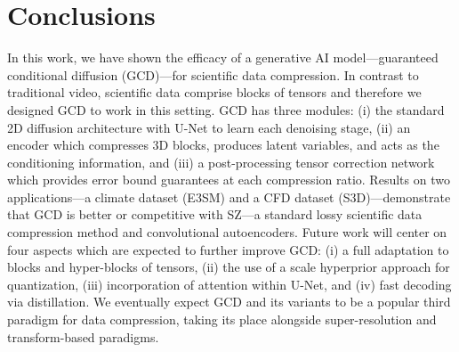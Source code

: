 \section{Conclusions}

In this work, we have shown the efficacy of a generative AI model---guaranteed conditional diffusion (GCD)---for scientific data compression. In contrast to traditional video, scientific data comprise blocks of tensors and therefore we designed GCD to work in this setting. GCD has three modules: (i) the standard 2D diffusion architecture with U-Net to learn each denoising stage, (ii) an encoder which compresses 3D blocks, produces latent variables, and acts as the conditioning information, and (iii) a post-processing tensor correction network which provides error bound guarantees at each compression ratio. Results on two applications---a climate dataset (E3SM) and a CFD dataset (S3D)---demonstrate that GCD is better or competitive with SZ---a standard lossy scientific data compression method and convolutional autoencoders. Future work will center on four aspects which are expected to further improve GCD: (i) a full adaptation to blocks and hyper-blocks of tensors, (ii) the use of a scale hyperprior approach for quantization, (iii) incorporation of attention within U-Net, and (iv) fast decoding via distillation. We eventually expect GCD and its variants to be a popular third paradigm for data compression, taking its place alongside super-resolution and transform-based paradigms.